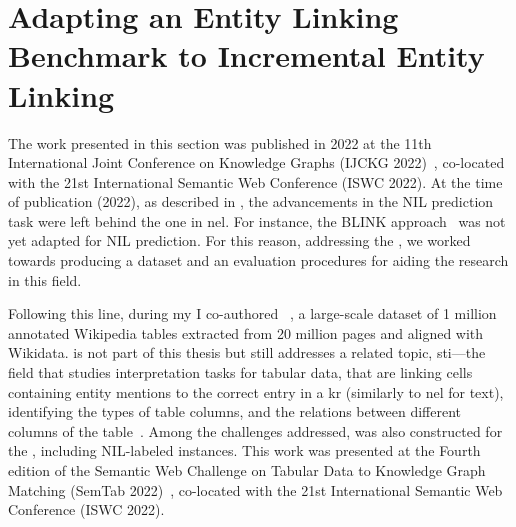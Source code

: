 \section{Adapting an Entity Linking Benchmark to Incremental Entity Linking}
\label{sec:ijckg}



The work presented in this section was published in 2022 at the 11th International Joint Conference on Knowledge Graphs (IJCKG 2022)~\cite{ijckg2022}, co-located with the 21st International Semantic Web Conference (ISWC 2022).
%
%
At the time of publication (2022), as described in , the advancements in the NIL prediction task were left behind the one in \ac{nel}. For instance, the BLINK approach~\cite{blink} was not yet adapted for NIL prediction.
For this reason, addressing the \nilchallenge, we worked towards producing a dataset and an evaluation procedures for aiding the research in this field.

Following this line, during my \phd I co-authored \emph{\mammotab}~\cite{mammotab}, a large-scale dataset of 1 million annotated Wikipedia tables extracted from 20 million pages and aligned with Wikidata. \mammotab is not part of this thesis but still addresses a related topic, \acf{sti}---the field that studies interpretation tasks for tabular data, that are linking cells containing entity mentions to the correct entry in a \ac{kr} (similarly to \ac{nel} for text), identifying the types of table columns, and the relations between different columns of the table~\cite{cremaschi2024surveysemanticinterpretationtabular}. Among the challenges addressed, \mammotab was also constructed for the \nilchallenge, including NIL-labeled instances. This work was presented at the Fourth edition of the Semantic Web Challenge on Tabular Data to Knowledge Graph Matching (SemTab 2022)~\cite{mammotab}, co-located with the 21st International Semantic Web Conference (ISWC 2022).

